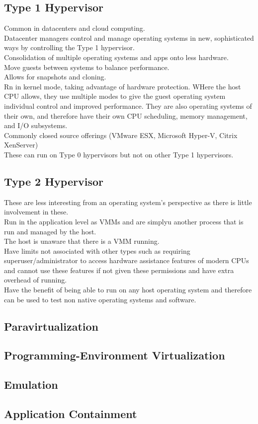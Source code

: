 \documentclass{book/custombook}
\begin{document}
            \subsection{Type 1 Hypervisor}
                Common in datacenters and cloud computing.\\
                Datacenter managers control and manage operating systems in new, sophisticated ways by controlling the Type 1
                hypervisor.\\
                Consolidation of multiple operating systems and apps onto less hardware.\\
                Move guests between systems to balance performance.\\
                Allows for snapshots and cloning.\\
                Rn in kernel mode, taking advantage of hardware protection. WHere the host CPU allows, they 
                use multiple modes to give the guest operating system individual control and improved performance.
                They are also operating systems of their own, and therefore have their own CPU scheduling,
                memory management, and I/O subsystems.\\
                Commonly closed source offerings (VMware ESX, Microsoft Hyper-V, Citrix XenServer)\\
                These can run on Type 0 hypervisors but not on other Type 1 hypervisors.\\
            \subsection{Type 2 Hypervisor}
                These are less interesting from an operating system's perspective as there is little involvement 
                in these.\\
                Run in the application level as VMMs and are simplyu another process that is run and managed by the host.\\
                The host is unaware that there is a VMM running.\\
                Have limits not associated with other types such as requiring superuser/administrator to access hardware assistance
                features of modern CPUs and cannot use these features if not given these permissions and have extra overhead
                of running.\\
                Have the benefit of being able to run on any host operating system and therefore can be used to test non native
                operating systems and software.
            \subsection{Paravirtualization}
            \subsection{Programming-Environment Virtualization}
            \subsection{Emulation}
            \subsection{Application Containment}
    \listoffigures
\end{document}

